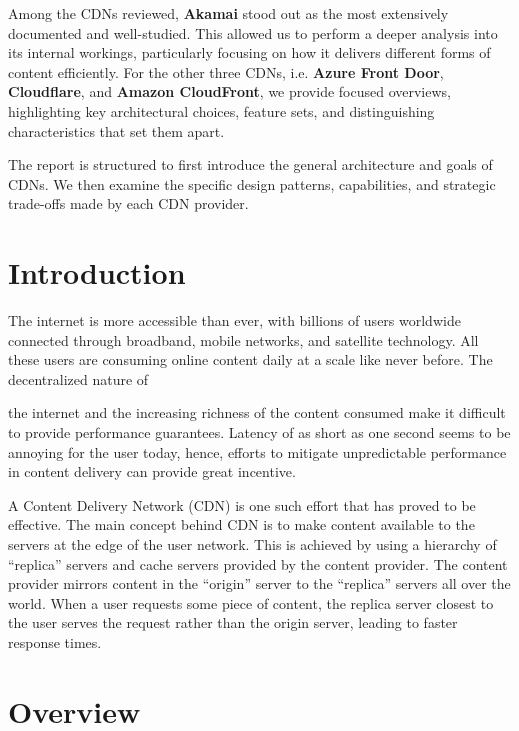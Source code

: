 \documentclass[12pt]{article}
\begin{document}
Among the CDNs reviewed, \textbf{Akamai} stood out as the most extensively documented and well-studied. This allowed us to perform a deeper analysis into its internal workings, particularly focusing on how it delivers different forms of content efficiently. For the other three CDNs, i.e. \textbf{Azure Front Door}, \textbf{Cloudflare}, and \textbf{Amazon CloudFront}, we provide focused overviews, highlighting key architectural choices, feature sets, and distinguishing characteristics that set them apart.

The report is structured to first introduce the general architecture and goals of CDNs. We then examine the specific design patterns, capabilities, and strategic trade-offs made by each CDN provider.


\clearpage
\tableofcontents

\clearpage

\section{Introduction}
The internet is more accessible than ever, with billions of users worldwide connected
through broadband, mobile networks, and satellite technology. All these users are
consuming online content daily at a scale like never before. The decentralized nature of

the internet and the increasing richness of the content consumed make it difficult to
provide performance guarantees. Latency of as short as one second seems to be
annoying for the user today, hence, efforts to mitigate unpredictable performance in
content delivery can provide great incentive.

A Content Delivery Network (CDN) is one such effort that has proved to be effective.
The main concept behind CDN is to make content available to the servers at the edge
of the user network. This is achieved by using a hierarchy of “replica” servers and cache
servers provided by the content provider. The content provider mirrors content in the
“origin” server to the “replica” servers all over the world. When a user requests some
piece of content, the replica server closest to the user serves the request rather than the
origin server, leading to faster response times.

\section{Overview}
\end{document}
